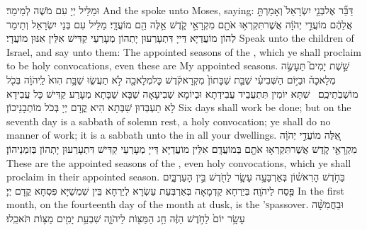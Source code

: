 {וּמַלֵּיל יְיָ עִם מֹשֶׁה לְמֵימַר׃}
{And the \lord\space spoke unto Moses, saying:}{}
{דַּבֵּ֞ר אֶל\maqqaf בְּנֵ֤י יִשְׂרָאֵל֙ וְאָמַרְתָּ֣ אֲלֵהֶ֔ם מוֹעֲדֵ֣י יְהֹוָ֔ה אֲשֶׁר\maqqaf תִּקְרְא֥וּ אֹתָ֖ם מִקְרָאֵ֣י קֹ֑דֶשׁ אֵ֥לֶּה הֵ֖ם מוֹעֲדָֽי׃}
{מַלֵּיל עִם בְּנֵי יִשְׂרָאֵל וְתֵימַר לְהוֹן מוֹעֲדַיָּא דַּייָ דִּתְעָרְעוּן יָתְהוֹן מְעָרְעֵי קַדִּישׁ אִלֵּין אִנּוּן מוֹעֲדָי׃}
{Speak unto the children of Israel, and say unto them: The appointed seasons of the \lord, which ye shall proclaim to be holy convocations, even these are My appointed seasons.}{}
{שֵׁ֣שֶׁת יָמִים֮ תֵּעָשֶׂ֣ה מְלָאכָה֒ וּבַיּ֣וֹם הַשְּׁבִיעִ֗י שַׁבַּ֤ת שַׁבָּתוֹן֙ מִקְרָא\maqqaf קֹ֔דֶשׁ כׇּל\maqqaf מְלָאכָ֖ה לֹ֣א תַעֲשׂ֑וּ שַׁבָּ֥ת הִוא֙ לַֽיהֹוָ֔ה בְּכֹ֖ל מוֹשְׁבֹֽתֵיכֶֽם׃ \petucha }
{שִׁתָּא יוֹמִין תִּתְעֲבֵיד עֲבִידְתָא וּבְיוֹמָא שְׁבִיעָאָה שַׁבָּא שַׁבָּתָא מְעָרַע קַדִּישׁ כָּל עֲבִידָא לָא תַעְבְּדוּן שַׁבְּתָא הִיא קֳדָם יְיָ בְּכֹל מוֹתְבָנֵיכוֹן׃}
{Six days shall work be done; but on the seventh day is a sabbath of solemn rest, a holy convocation; ye shall do no manner of work; it is a sabbath unto the \lord\space in all your dwellings.}{}
{אֵ֚לֶּה מוֹעֲדֵ֣י יְהֹוָ֔ה מִקְרָאֵ֖י קֹ֑דֶשׁ אֲשֶׁר\maqqaf תִּקְרְא֥וּ אֹתָ֖ם בְּמוֹעֲדָֽם׃}
{אִלֵּין מוֹעֲדַיָּא דַּייָ מְעָרְעֵי קַדִּישׁ דִּתְעָרְעוּן יָתְהוֹן בְּזִמְנֵיהוֹן׃}
{These are the appointed seasons of the \lord, even holy convocations, which ye shall proclaim in their appointed season.}{}
{בַּחֹ֣דֶשׁ הָרִאשׁ֗וֹן בְּאַרְבָּעָ֥ה עָשָׂ֛ר לַחֹ֖דֶשׁ בֵּ֣ין הָעַרְבָּ֑יִם פֶּ֖סַח לַיהֹוָֽה׃}
{בְּיַרְחָא קַדְמָאָה בְּאַרְבְּעַת עַשְׂרָא לְיַרְחָא בֵּין שִׁמְשַׁיָּא פִּסְחָא קֳדָם יְיָ׃}
{In the first month, on the fourteenth day of the month at dusk, is the \lord\textsc{’s}\space passover.}{}
{וּבַחֲמִשָּׁ֨ה עָשָׂ֥ר יוֹם֙ לַחֹ֣דֶשׁ הַזֶּ֔ה חַ֥ג הַמַּצּ֖וֹת לַיהֹוָ֑ה שִׁבְעַ֥ת יָמִ֖ים מַצּ֥וֹת תֹּאכֵֽלוּ׃}
